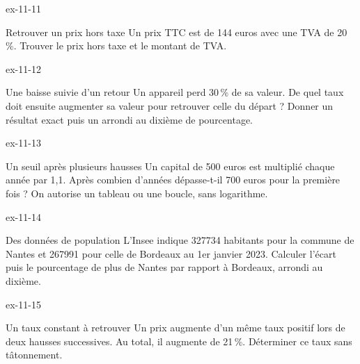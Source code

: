 \clearpage{}
\begin{blocLivre}{ex-11-11}
\begin{exercice}[3]{Retrouver un prix hors taxe}
Un prix TTC est de 144 euros avec une TVA de 20\,\%. Trouver le prix hors taxe et le montant de TVA.
\end{exercice}
\end{blocLivre}
\begin{blocLivre}{ex-11-12}
\begin{exercice}[3]{Une baisse suivie d’un retour}
Un appareil perd 30\,\% de sa valeur. De quel taux doit ensuite augmenter sa valeur pour retrouver celle du départ ? Donner un résultat exact puis un arrondi au dixième de pourcentage.
\end{exercice}
\end{blocLivre}
\begin{blocLivre}{ex-11-13}
\begin{exercice}[3]{Un seuil après plusieurs hausses}
Un capital de 500 euros est multiplié chaque année par 1,1. Après combien d’années dépasse-t-il 700 euros pour la première fois ? On autorise un tableau ou une boucle, sans logarithme.
\end{exercice}
\end{blocLivre}
\begin{blocLivre}{ex-11-14}
\begin{exercice}[3]{Des données de population}
L’Insee indique 327734 habitants pour la commune de Nantes et 267991 pour celle de Bordeaux au 1er janvier 2023. Calculer l’écart puis le pourcentage de plus de Nantes par rapport à Bordeaux, arrondi au dixième. \par\smallskip{}
\end{exercice}
\end{blocLivre}
\begin{blocLivre}{ex-11-15}
\begin{exercice}[3]{Un taux constant à retrouver}
Un prix augmente d’un même taux positif lors de deux hausses successives. Au total, il augmente de 21\,\%. Déterminer ce taux sans tâtonnement.
\end{exercice}
\end{blocLivre}

\clearpage
